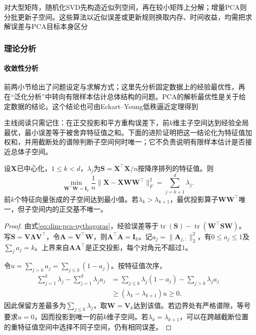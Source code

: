 对大型矩阵，随机化SVD先构造近似列空间，再在较小矩阵上分解；增量PCA则分批更新子空间。这些算法以近似误差或更新规则换取内存、时间收益，均需把求解误差与PCA目标本身区分

\subsubsection{理论分析}
\label{sec:dim-pca-theory}

\paragraph{收敛性分析}

前两小节给出了问题设定与求解方式；这里先分析固定数据上的经验最优性，再在“泛化分析”中转向有限样本估计总体结构的问题。PCA的解析最优性是关于给定数据的结论。这个结论也可由Eckart--Young低秩逼近定理得到

主线阅读只需记住：在正交投影和平方重构误差下，前$k$维主子空间达到经验全局最优，最小误差等于被舍弃特征值之和。下面的进阶证明把这一结论化为特征值加权和，并用截断处的谱隙判断子空间何时唯一；它不负责说明有限样本估计是否接近总体子空间。

\begin{theorem}[PCA的最优线性重构性质]
  \label{thm:dim-pca-optimal}
  设$\bm{X}$已中心化，$1\leq k<d$，$\lambda_j$为$\bm{S}=\bm{X}^{\top}\bm{X}/n$按降序排列的特征值。则
  \[
    \min_{\bm{W}^{\top}\bm{W}=\bm{I}_k}
       \frac1n\lVert\bm{X}-\bm{X}\bm{W}\bm{W}^{\top}\rVert_F^2
       =\sum_{j=k+1}^{d}\lambda_j.
  \]
  前$k$个特征向量张成的子空间达到最小值。若$\lambda_k>\lambda_{k+1}$，最优投影算子$\bm{W}\bm{W}^{\top}$唯一，但子空间内的正交基不唯一。
\end{theorem}

\begin{proof}
由式\eqref{eq:dim-pca-pythagoras}，经验误差等于$\operatorname{tr}(\bm{S})-\operatorname{tr}(\bm{W}^{\top}\bm{S}\bm{W})$。写$\bm{S}=\bm{V}\bm{\Lambda}\bm{V}^{\top}$，令$\bm{A}=\bm{V}^{\top}\bm{W}$，则$\bm{A}^{\top}\bm{A}=\bm{I}_k$。记$a_j=\lVert\bm{A}_{j,:}\rVert_2^2$，有$0\leq a_j\leq1$及$\sum_j a_j=k$。上界来自$\bm{A}\bm{A}^{\top}$是正交投影，每个对角元不超过$1$。

令$u=\sum_{j>k}a_j=\sum_{j\leq k}(1-a_j)$。按特征值次序，
\[
  \begin{aligned}
  \sum_{j=1}^{k}\lambda_j-\sum_{j=1}^{d}\lambda_j a_j
  &=\sum_{j\leq k}\lambda_j(1-a_j)
       -\sum_{j>k}\lambda_j a_j\\
  &\geq(\lambda_k-\lambda_{k+1})u\geq0.
  \end{aligned}
\]
因此保留方差最多为$\sum_{j\leq k}\lambda_j$，取$\bm{W}=\bm{V}_k$达到该值。若边界处有严格谱隙，等号要求$u=0$，因而投影到唯一的前$k$维子空间。若$\lambda_k=\lambda_{k+1}$，可以在跨越截断位置的重特征值空间中选择不同子空间，仍有相同误差。
\end{proof}

